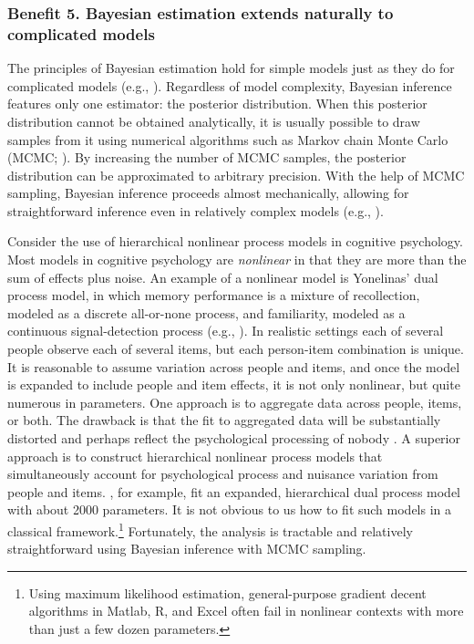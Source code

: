 \subsubsection{Benefit 5. Bayesian estimation extends naturally to complicated models}
The principles of Bayesian estimation hold for simple models just as they do for complicated models (e.g., ). Regardless of model complexity, Bayesian inference features only one estimator: the posterior distribution. When this posterior distribution cannot be obtained analytically, it is usually possible to draw samples from it using numerical algorithms such as Markov chain Monte Carlo (MCMC; ). By increasing the number of MCMC samples, the posterior distribution can be approximated to arbitrary precision. With the help of MCMC sampling, Bayesian inference proceeds almost mechanically, allowing for straightforward inference even in relatively complex models (e.g., ).

Consider the use of hierarchical nonlinear process models in cognitive psychology. Most models in cognitive psychology are {\em nonlinear} in that they are more than the sum of effects plus noise. An example of a nonlinear model is Yonelinas' dual process model, in which memory performance is a mixture of recollection, modeled as a discrete all-or-none process, and familiarity, modeled as a continuous signal-detection process (e.g., ). In realistic settings each of several people observe each of several items, but each person-item combination is unique. It is reasonable to assume variation across people and items, and once the model is expanded to include people and item effects, it is not only nonlinear, but quite numerous in parameters. One approach is to aggregate data across people, items, or both.  The drawback is that the fit to aggregated data will be substantially distorted and perhaps reflect the psychological processing of nobody \cite{Estes1956,HeathcoteEtAl2000,RouderEtAl2005}. A superior approach is to construct hierarchical nonlinear process models that simultaneously account for psychological process and nuisance variation from people and items.  , for example, fit an expanded, hierarchical dual process model with about 2000 parameters. It is not obvious to us how to fit such models in a classical framework.\footnote{Using maximum likelihood estimation, general-purpose gradient decent algorithms in Matlab, R, and Excel often fail in nonlinear contexts with more than just a few dozen parameters.} Fortunately, the analysis is tractable and relatively straightforward using Bayesian inference with MCMC sampling.

